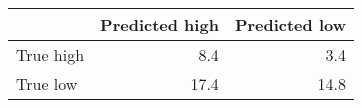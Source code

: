 \begin{tabular}{lrr}
\hline
           &   Predicted high &   Predicted low \\
\hline
 True high &              8.4 &             3.4 \\
 True low  &             17.4 &            14.8 \\
\hline
\end{tabular}